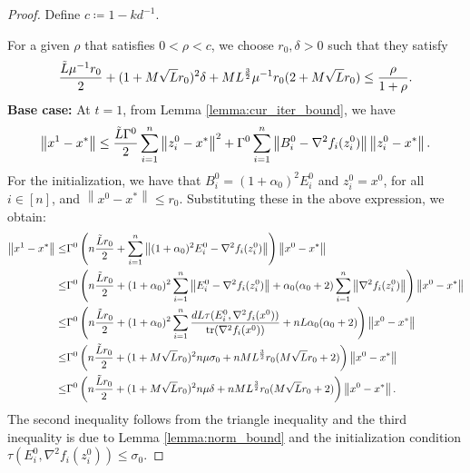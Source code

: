 \documentclass[letterpaper]{article} %
\theoremstyle{plain}
\theoremstyle{definition}
\theoremstyle{remark}
\newcommand\norm[1]{\left\lVert#1\right\rVert}
\begin{document}
\begin{proof}
    Define $c \coloneqq 1 - k d^{-1}$.

    For a given $\rho$ that satisfies $0 < \rho < c$, we choose $r_0, \delta > 0$ such that they satisfy
    \begin{equation}
          \frac{\Tilde{L} \mu^{-1} r_0 }{ 2 } +  (1 + M \sqrt{L} r_0 )^2  \delta  +  M L^{\frac{3}{2}} \mu^{-1} r_0  (2 + M \sqrt{L}  r_0 ) \leq \frac{\rho}{ 1 + \rho}.
         \label{rho_condition}
    \end{equation}
    \textbf{Base case:} At $t=1$, from Lemma \ref{lemma:cur_iter_bound}, we have
    \begin{equation*}
        \norm{x^1 - x^*} \leq \frac{\Tilde{L}\Gamma^0}{2} \sum_{i=1}^n \norm{z_i^0 - x^*}^2 + \Gamma^0 \sum_{i=1}^n \norm{B_i^0 - \nabla^2 f_i (z_i^0)} \norm{z_i^0 - x^*}.
    \end{equation*}
    For the initialization, we have that $B_i^0 = (1 + \alpha_0)^2 E_i^0$ and $z_i^0 = x^0$, for all $i \in [n]$, and $\norm{x^0 - x^*} \leq r_0$. Substituting these in the above expression, we obtain:
    \begin{align*}
        \norm{x^1 - x^*} \leq & \Gamma^0 \left(n\frac{\Tilde{L} r_0}{2} + \sum_{i=1}^n \norm{(1 + \alpha_0)^2 E_i^0 - \nabla^2 f_i (z_i^0)}\right) \norm{x^0 - x^*} \\
        \leq & \Gamma^0 \left(n\frac{\Tilde{L} r_0}{2} + (1 + \alpha_0)^2 \sum_{i=1}^n \norm{ E_i^0 - \nabla^2 f_i (z_i^0)} + \alpha_0 (\alpha_0 + 2) \sum_{i=1}^n \norm{\nabla^2 f_i(z_i^0)}\right) \norm{x^0 - x^*} \\
         \leq & \Gamma^0 \left(n\frac{\Tilde{L} r_0}{2} + (1 + \alpha_0)^2 \sum_{i=1}^n \frac{d L \tau(E_i^0, \nabla^2 f_i(x^0))}{\mathrm{tr}(\nabla^2 f_i(x^0))} + n L \alpha_0 (\alpha_0 + 2) \right) \norm{x^0 - x^*} \\
         \leq & \Gamma^0 \left(n\frac{\Tilde{L} r_0}{2} + (1 + M \sqrt{L} r_0)^2 n \mu \sigma_0 + n M L^{\frac{3}{2}} r_0 (M \sqrt{L} r_0 + 2) \right) \norm{x^0 - x^*} \\
         \leq & \Gamma^0 \left(n\frac{\Tilde{L} r_0}{2} + (1 + M \sqrt{L} r_0)^2 n \mu \delta + n M L^{\frac{3}{2}} r_0 (M \sqrt{L} r_0 + 2) \right) \norm{x^0 - x^*}.
    \end{align*} 
    The second inequality follows from the triangle inequality and the third inequality is due to Lemma \ref{lemma:norm_bound} and the initialization condition $\tau(E_i^0, \nabla^2 f_i(z_i^0)) \leq \sigma_0$.


\end{proof}
\end{document}
